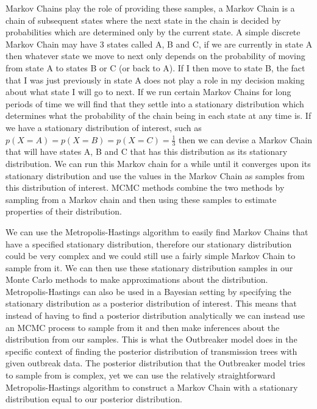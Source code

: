 \documentclass[11pt,a4paper]{report}
\begin{document}
Markov Chains play the role of providing these samples, a Markov Chain is a chain of subsequent states where the next state in the chain is decided by probabilities which are determined only by the current state. A simple discrete Markov Chain may have 3 states called A, B and C, if we are currently in state A then whatever state we move to next only depends on the probability of moving from state A to states B or C (or back to A). If I then move to state B, the fact that I was just previously in state A does not play a role in my decision making about what state I will go to next. If we run certain Markov Chains for long periods of time we will find that they settle into a stationary distribution which determines what the probability of the chain being in each state at any time is. If we have a stationary distribution of interest, such as $p(X=A)=p(X=B)=p(X=C)=\frac{1}{3}$ then we can devise a Markov Chain that will have states A, B and C that has this distribution as its stationary distribution. We can run this Markov chain for a while until it converges upon its stationary distribution and use the values in the Markov Chain as samples from this distribution of interest. MCMC methods combine the two methods by sampling from a Markov chain and then using these samples to estimate properties of their distribution.

We can use the Metropolis-Hastings algorithm to easily find Markov Chains that have a specified stationary distribution, therefore our stationary distribution could be very complex and we could still use a fairly simple Markov Chain to sample from it. We can then use these stationary distribution samples in our Monte Carlo methods to make approximations about the distribution. Metropolis-Hastings can also be used in a Bayesian setting by specifying the stationary distribution as a posterior distribution of interest. This means that instead of having to find a posterior distribution analytically we can instead use an MCMC process to sample from it and then make inferences about the distribution from our samples. This is what the Outbreaker model does in the specific context of finding the posterior distribution of transmission trees with given outbreak data. The posterior distribution that the Outbreaker model tries to sample from is complex, yet we can use the relatively straightforward Metropolis-Hastings algorithm to construct a Markov Chain with a stationary distribution equal to our posterior distribution.
\end{document}
